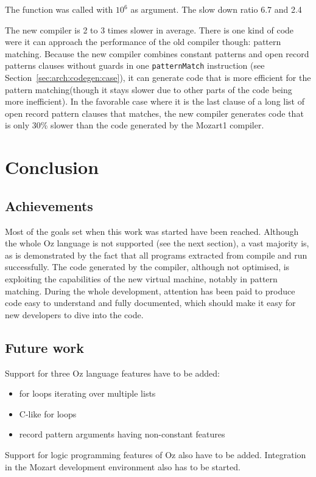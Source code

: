 \documentclass[a4paper]{memoir}
\begin{document}
The function was called with $10^6$ as argument.
The slow down ratio 6.7 and 2.4

The new compiler is 2 to 3 times slower in average. There is one kind of code
were it can approach the performance of the old compiler though: pattern
matching. Because the new compiler combines constant patterns and open record
patterns clauses without guards in one \lstinline!patternMatch! instruction (see
Section~\ref{sec:arch:codegen:case}), it can generate code that
is more efficient for the pattern matching(though it stays slower due to other parts of the code being more
inefficient).
In the favorable case where it is the last clause of a long list of open record
pattern clauses that matches, the new compiler generates code that is only 30\% slower than the
code generated by the Mozart1 compiler.


\chapter{Conclusion}
\section{Achievements}
Most of the goals set when this work was started have been reached.
Although the whole Oz language is not supported (see the next section), a vast majority is, as is demonstrated by the fact that all programs extracted from \cite{CTMCP} compile and run successfully. The code generated by the compiler, although not optimised, is exploiting the capabilities of the new virtual machine, notably in pattern matching.  During the whole development, attention has been paid to produce code easy to understand and fully documented, which should make it easy for new developers to dive into the code.

\section{Future work}

Support for three Oz language features have to be added:
\begin{itemize}
  \item for loops iterating over multiple lists
  \item C-like for loops
  \item record pattern arguments having non-constant features
\end{itemize}

Support for logic programming features of Oz also have to be added.
Integration in the Mozart development environment also has to be started.
\end{document}
